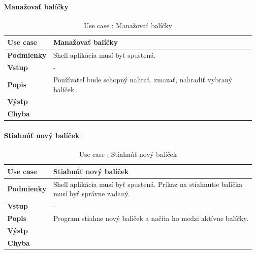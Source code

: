 \paragraph{Manažovať balíčky}
\begin{center}
	\begin{table}[htbp]
		\begin{tabular}{|p{2.5cm}|p{14cm}|}
			\hline
			\textbf{Use case} & Manažovať balíčky \\ 
			\hline
			\textbf{Podmienky} & Shell aplikácia musí byť spustená.\\ 
			\hline
			\textbf{Vstup} & -\\
			\hline
			\textbf{Popis} & Používateľ bude schopný nahrať, zmazať, nahradiť vybraný balíček. \\ 
			\hline
			\textbf{Výstp} & \\
			\hline
			\textbf{Chyba} & \\
			\hline
		\end{tabular}
	\label{table:1}
	\caption{Use case : Manažovať balíčky}
	\end{table}
\end{center}
\paragraph{Stiahnúť nový balíček}
\begin{center}
	\begin{table}[htbp]
		\begin{tabular}{|p{2.5cm}|p{14cm}|}
			\hline
			\textbf{Use case} & Stiahnúť nový balíček \\ 
			\hline
			\textbf{Podmienky} & Shell aplikácia musí byť spustená. Príkaz na stiahnutie balíčka musí byť správne zadaný.\\ 
			\hline
			\textbf{Vstup} & -\\
			\hline
			\textbf{Popis} & Program stiahne nový balíček a načíta ho medzi aktívne balíčky. \\ 
			\hline
			\textbf{Výstp} & \\
			\hline
			\textbf{Chyba} & \\
			\hline
		\end{tabular}
		\label{table:1}
		\caption{Use case : Stiahnúť nový balíček}
	\end{table}
\end{center}
